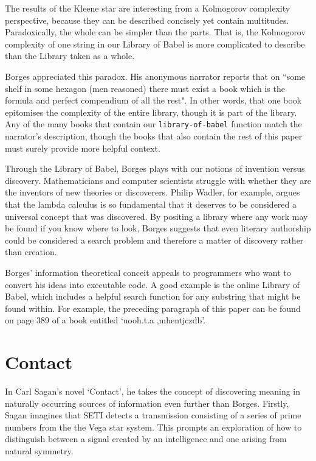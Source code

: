 \documentclass[numbers]{sigplanconf}
\begin{document}
The results of the Kleene star are interesting from a Kolmogorov complexity perspective, because they can be described
concisely yet contain multitudes. Paradoxically, the whole can be simpler than the parts.
That is, the Kolmogorov complexity of one string in our Library of Babel is more complicated to describe than the Library
taken as a whole.

Borges appreciated this paradox. His anonymous narrator reports that on ``some shelf in some hexagon (men reasoned)
there must exist a book which is the formula and perfect compendium of all the rest". In other words, that one book
epitomises the complexity of the entire library, though it is part of the library. Any of the many books that contain our
\verb|library-of-babel| function match the narrator's description, though the books that also contain the rest of this paper
must surely provide more helpful context.

Through the Library of Babel, Borges plays with our notions of invention versus discovery. Mathematicians and computer
scientists struggle with whether they are the inventors of new theories or discoverers. Philip Wadler, for example,
argues that the lambda calculus is so fundamental that it deserves to be considered a universal concept that
was discovered\cite{Propositions as Types}. By positing a library where any work may be found if you know where to look, Borges
suggests that even literary authorship could be considered a search problem and therefore a matter of discovery rather than
creation.

Borges' information theoretical conceit appeals to programmers who want to convert his ideas into executable code.
A good example is the online Library of Babel, which includes a helpful search function for any substring that might be found
within\cite{Online Library of Babel}. For example, the preceding paragraph of this paper can be found on page 389 of a book
entitled `uooh.t.a ,mhentjczdb'.

\section{Contact}

In Carl Sagan's novel `Contact'\cite{Contact}, he takes the concept of discovering meaning in naturally occurring sources of
information even further than Borges. Firstly, Sagan imagines that SETI detects a transmission consisting of a series of prime
numbers from the the Vega star system. This prompts an exploration of how to distinguish between a signal created by an
intelligence and one arising from natural symmetry.
\end{document}
